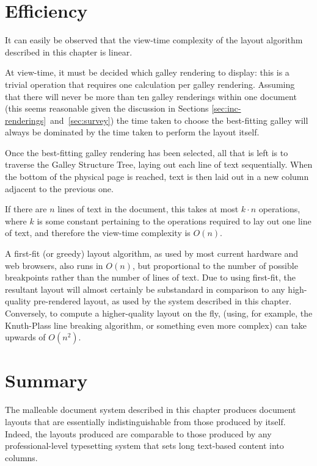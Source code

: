 \section{Efficiency}

It can easily be observed that the view-time complexity of the layout algorithm described in this chapter is linear.

At view-time, it must be decided which galley rendering to display: this is a trivial operation that requires one calculation per galley rendering. Assuming that there will never be more than ten galley renderings within one document (this seems reasonable given the discussion in Sections \ref{sec:inc-renderings}~and~\ref{sec:survey}) the time taken to choose the best-fitting galley will always be dominated by the time taken to perform the layout itself.

Once the best-fitting galley rendering has been selected, all that is left is to traverse the Galley Structure Tree, laying out each line of text sequentially. When the bottom of the physical page is reached, text is then laid out in a new column adjacent to the previous one.

If there are $n$ lines of text in the document, this takes at most $k\cdot{}n$ operations, where $k$ is some constant pertaining to the operations required to lay out one line of text, and therefore the view-time complexity is $O(n)$.

A first-fit (or greedy) layout algorithm, as used by most current \ebook{} hardware and web browsers, also runs in $O(n)$, but proportional to the number of possible breakpoints rather than the number of lines of text. Due to using first-fit, the resultant layout will almost certainly be substandard in comparison to any high-quality pre-rendered layout, as used by the system described in this chapter. Conversely, to compute a higher-quality layout on the fly, (using, for example, the Knuth-Plass line breaking algorithm,\hspace{0pt}\cite{Knuth1981,Knuth1999} or something even more complex) can take upwards of $O(n^2)$.\hspace{0pt}\cite{Hirschberg1987,Eppstein1992,Hurst2009,Pinkney2013}

\section{Summary}
The malleable document system described in this chapter produces document layouts that are essentially indistinguishable from those produced by \troff{} itself. Indeed, the layouts produced are comparable to those produced by any professional-level typesetting system that sets long text-based content into columns.

